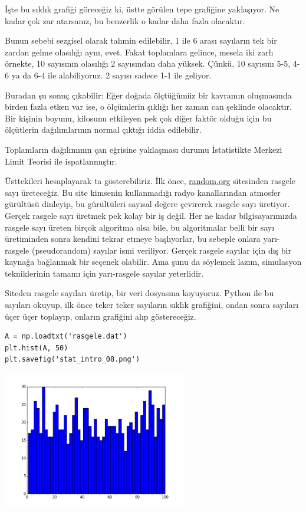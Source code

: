 \documentclass[12pt,fleqn]{article}\usepackage{../../common}
\begin{document}
İşte bu sıklık grafiği göreceğiz ki, üstte görülen tepe grafiğine
yaklaşıyor. Ne kadar çok zar atarsanız, bu benzerlik o kadar daha fazla
olacaktır.

Bunun sebebi sezgisel olarak tahmin edilebilir, 1 ile 6 arası sayıların tek
bir zardan gelme olasılığı aynı, evet. Fakat toplamlara gelince, mesela iki
zarlı örnekte, 10 sayısının olasılığı 2 sayısından daha yüksek. Çünkü, 10
sayısını 5-5, 4-6 ya da 6-4 ile alabiliyoruz. 2 sayısı sadece 1-1 ile
geliyor.

Buradan şu sonuç çıkabilir: Eğer doğada ölçtüğümüz bir kavramın oluşmasında
birden fazla etken var ise, o ölçümlerin şıklığı her zaman can şeklinde
olacaktır. Bir kişinin boyunu, kilosunu etkileyen pek çok diğer faktör
olduğu için bu ölçütlerin dağılımlarının normal çıktığı iddia edilebilir.

Toplamların dağılımının çan eğrisine yaklaşması durumu İstatistikte Merkezi
Limit Teorisi ile ispatlanmıştır. 

Üsttekileri hesaplayarak ta gösterebiliriz. İlk önce, \url{random.org}
sitesinden rasgele sayı üreteceğiz. Bu site kimsenin kullanmadığı radyo
kanallarından atmosfer gürültüsü dinleyip, bu gürültüleri sayısal değere
çevirerek rasgele sayı üretiyor. Gerçek rasgele sayı üretmek pek kolay bir
iş değil. Her ne kadar bilgisayarımızda rasgele sayı üreten birçok
algoritma olsa bile, bu algoritmalar belli bir sayı üretiminden sonra
kendini tekrar etmeye başlıyorlar, bu sebeple onlara yarı-rasgele
(pseudorandom) sayılar ismi veriliyor. Gerçek rasgele sayılar için dış bir
kaynağa bağlanmak bir seçenek olabilir. Ama şunu da söylemek lazım,
simulasyon tekniklerinin tamamı için yarı-rasgele sayılar yeterlidir.

Siteden rasgele sayıları üretip, bir veri dosyasına koyuyoruz. Python ile
bu sayıları okuyup, ilk önce teker teker sayıların sıklık grafiğini, ondan
sonra sayıları üçer üçer toplayıp, onların grafiğini alıp
göstereceğiz. 

\begin{verbatim}
A = np.loadtxt('rasgele.dat')
plt.hist(A, 50)
plt.savefig('stat_intro_08.png')
\end{verbatim}

\includegraphics[height=6cm]{stat_intro_08.png}
\end{document}
